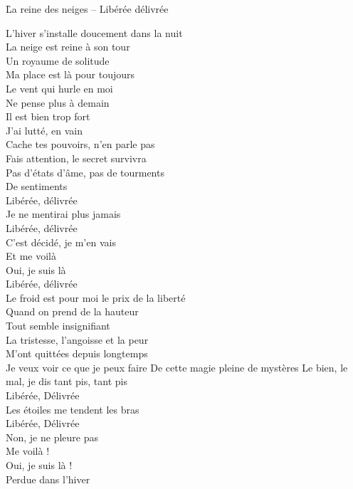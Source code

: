 \documentclass{novel}
\begin{document}
\newpage
\normalsize
\h*{La reine des neiges – Libérée délivrée}
\begin{multicols}{2}
L'hiver s'installe doucement dans la nuit \\
La neige est reine à son tour \\
Un royaume de solitude \\
Ma place est là pour toujours \\

Le vent qui hurle en moi \\
Ne pense plus à demain \\
Il est bien trop fort \\
J'ai lutté, en vain \\

Cache tes pouvoirs, n'en parle pas \\
Fais attention, le secret survivra \\
Pas d'états d'âme, pas de tourments \\
De sentiments \\

Libérée, délivrée \\
Je ne mentirai plus jamais \\
Libérée, délivrée \\
C'est décidé, je m'en vais \\
Et me voilà \\
Oui, je suis là \\
Libérée, délivrée \\
Le froid est pour moi le prix de la liberté \\

Quand on prend de la hauteur \\
Tout semble insignifiant \\
La tristesse, l'angoisse et la peur \\
M'ont quittées depuis longtemps \\

Je veux voir ce que je peux faire
De cette magie pleine de mystères
Le bien, le mal, je dis tant pis, tant pis \\

Libérée, Délivrée \\
Les étoiles me tendent les bras \\
Libérée, Délivrée \\
Non, je ne pleure pas \\
Me voilà ! \\
Oui, je suis là ! \\
Perdue dans l'hiver \\


\end{multicols}
\end{document}
